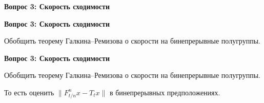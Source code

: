 \documentclass[11pt]{article}
\begin{document}
\newpage

\begin{center}
{\color{notaeYELLOW}\bfseries\fontsize{44}{52}\selectfont Вопрос 3: Скорость сходимости}
\end{center}
\vspace*{\fill}
\begin{center}
\fontsize{36}{43}\selectfont
\end{center}
\vspace*{\fill}

\newpage

\begin{center}
{\color{notaeYELLOW}\bfseries\fontsize{44}{52}\selectfont Вопрос 3: Скорость сходимости}
\end{center}
\vspace*{\fill}
\begin{center}
\fontsize{36}{43}\selectfont
\parbox{\linewidth}{\centering\noindent Обобщить теорему Галкина--Ремизова о скорости на бинепрерывные полугруппы.
\par}\vspace{0.4in}
\end{center}
\vspace*{\fill}

\newpage

\begin{center}
{\color{notaeYELLOW}\bfseries\fontsize{44}{52}\selectfont Вопрос 3: Скорость сходимости}
\end{center}
\vspace*{\fill}
\begin{center}
\fontsize{36}{43}\selectfont
\parbox{\linewidth}{\centering\noindent Обобщить теорему Галкина--Ремизова о скорости на бинепрерывные полугруппы.
\par}\vspace{0.4in}
\parbox{\linewidth}{\centering\noindent То есть оценить $\|F_{t/n}^n x-T_t x\|$ в бинепрерывных предположениях.
\par}\vspace{0.4in}
\end{center}
\vspace*{\fill}

\newpage
\end{document}
